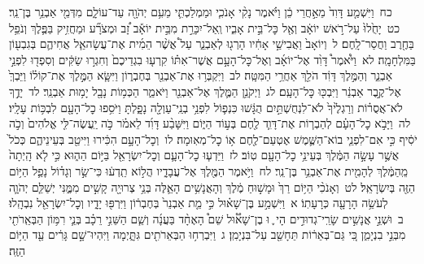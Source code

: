 \documentclass[18pt]{article}
\begin{document}
 {\loc כח~}וַיִּשְׁמַ֤ע דָּוִד֙ מֵאַ֣חֲרֵי כֵ֔ן וַיֹּ֗אמֶר נָקִ֨י אָנֹכִ֧י וּמַמְלַכְתִּ֛י מֵעִ֥ם יְהֹוָ֖ה עַד־עוֹלָ֑ם מִדְּמֵ֖י אַבְנֵ֥ר בֶּן־נֵֽר׃ \startlock
 {\loc כט~}יָחֻ֙לוּ֙ עַל־רֹ֣אשׁ יוֹאָ֔ב וְאֶ֖ל כׇּל־בֵּ֣ית אָבִ֑יו וְֽאַל־יִכָּרֵ֣ת מִבֵּ֣ית יוֹאָ֡ב זָ֠ב וּמְצֹרָ֞ע וּמַחֲזִ֥יק בַּפֶּ֛לֶךְ וְנֹפֵ֥ל בַּחֶ֖רֶב וַחֲסַר־לָֽחֶם׃ \startlock
 {\loc ל~}וְיוֹאָב֙ וַאֲבִישַׁ֣י אָחִ֔יו הָרְג֖וּ לְאַבְנֵ֑ר עַל֩ אֲשֶׁ֨ר הֵמִ֜ית אֶת־עֲשָׂהאֵ֧ל אֲחִיהֶ֛ם בְּגִבְע֖וֹן בַּמִּלְחָמָֽה׃ \startlock
 {\loc לא~}וַיֹּ֩אמֶר֩ דָּוִ֨ד אֶל־יוֹאָ֜ב וְאֶל־כׇּל־הָעָ֣ם אֲשֶׁר־אִתּ֗וֹ קִרְע֤וּ בִגְדֵיכֶם֙ וְחִגְר֣וּ שַׂקִּ֔ים וְסִפְד֖וּ לִפְנֵ֣י אַבְנֵ֑ר וְהַמֶּ֣לֶךְ דָּוִ֔ד הֹלֵ֖ךְ אַחֲרֵ֥י הַמִּטָּֽה׃ \startlock
 {\loc לב~}וַיִּקְבְּר֥וּ אֶת־אַבְנֵ֖ר בְּחֶבְר֑וֹן וַיִּשָּׂ֧א הַמֶּ֣לֶךְ אֶת־קוֹל֗וֹ וַיֵּבְךְּ֙ אֶל־קֶ֣בֶר אַבְנֵ֔ר וַיִּבְכּ֖וּ כׇּל־הָעָֽם׃ \startlock
 {\loc לג~}וַיְקֹנֵ֥ן הַמֶּ֛לֶךְ אֶל־אַבְנֵ֖ר וַיֹּאמַ֑ר הַכְּמ֥וֹת נָבָ֖ל יָמ֥וּת אַבְנֵֽר׃ \startlock
 {\loc לד~}יָדֶ֣ךָ לֹא־אֲסֻר֗וֹת וְרַגְלֶ֙יךָ֙ לֹא־לִנְחֻשְׁתַּ֣יִם הֻגָּ֔שׁוּ כִּנְפ֛וֹל לִפְנֵ֥י בְנֵֽי־עַוְלָ֖ה נָפָ֑לְתָּ וַיֹּסִ֥פוּ כׇל־הָעָ֖ם לִבְכּ֥וֹת עָלָֽיו׃ \startlock
 {\loc לה~}וַיָּבֹ֣א כׇל־הָעָ֗ם לְהַבְר֧וֹת אֶת־דָּוִ֛ד לֶ֖חֶם בְּע֣וֹד הַיּ֑וֹם וַיִּשָּׁבַ֨ע דָּוִ֜ד לֵאמֹ֗ר כֹּ֣ה יַֽעֲשֶׂה־לִּ֤י אֱלֹהִים֙ וְכֹ֣ה יֹסִ֔יף כִּ֣י אִם־לִפְנֵ֧י בוֹא־הַשֶּׁ֛מֶשׁ אֶטְעַם־לֶ֖חֶם א֥וֹ כׇל־מְאֽוּמָה׃ \startlock
 {\loc לו~}וְכׇל־הָעָ֣ם הִכִּ֔ירוּ וַיִּיטַ֖ב בְּעֵינֵיהֶ֑ם כְּכֹל֙ אֲשֶׁ֣ר עָשָׂ֣ה הַמֶּ֔לֶךְ בְּעֵינֵ֥י כׇל־הָעָ֖ם טֽוֹב׃ \startlock
 {\loc לז~}וַיֵּדְע֧וּ כׇל־הָעָ֛ם וְכׇל־יִשְׂרָאֵ֖ל בַּיּ֣וֹם הַה֑וּא כִּ֣י לֹ֤א הָֽיְתָה֙ מֵֽהַמֶּ֔לֶךְ לְהָמִ֖ית אֶת־אַבְנֵ֥ר בֶּן־נֵֽר׃ \startlock
 {\loc לח~}וַיֹּ֥אמֶר הַמֶּ֖לֶךְ אֶל־עֲבָדָ֑יו הֲל֣וֹא תֵֽדְע֔וּ כִּי־שַׂ֣ר וְגָד֗וֹל נָפַ֛ל הַיּ֥וֹם הַזֶּ֖ה בְּיִשְׂרָאֵֽל׃ \startlock
 {\loc לט~}וְאָנֹכִ֨י הַיּ֥וֹם רַךְ֙ וּמָשׁ֣וּחַ מֶ֔לֶךְ וְהָאֲנָשִׁ֥ים הָאֵ֛לֶּה בְּנֵ֥י צְרוּיָ֖ה קָשִׁ֣ים מִמֶּ֑נִּי יְשַׁלֵּ֧ם יְהֹוָ֛ה לְעֹשֵׂ֥ה הָרָעָ֖ה כְּרָעָתֽוֹ׃ 
\startlock
 {\loc א~}וַיִּשְׁמַ֣ע בֶּן־שָׁא֗וּל כִּ֣י מֵ֤ת אַבְנֵר֙ בְּחֶבְר֔וֹן וַיִּרְפּ֖וּ יָדָ֑יו וְכׇל־יִשְׂרָאֵ֖ל נִבְהָֽלוּ׃ \startlock
 {\loc ב~}וּשְׁנֵ֣י אֲנָשִׁ֣ים שָׂרֵֽי־גְדוּדִ֣ים הָי ֪ וּ בֶן־שָׁא֟וּל שֵׁם֩ הָאֶחָ֨ד בַּעֲנָ֜ה וְשֵׁ֧ם הַשֵּׁנִ֣י רֵכָ֗ב בְּנֵ֛י רִמּ֥וֹן הַבְּאֵֽרֹתִ֖י מִבְּנֵ֣י בִנְיָמִ֑ן כִּ֚י גַּם־בְּאֵר֔וֹת תֵּחָשֵׁ֖ב עַל־בִּנְיָמִֽן׃ \startlock
 {\loc ג~}וַיִּבְרְח֥וּ הַבְּאֵרֹתִ֖ים גִּתָּ֑יְמָה וַיִּהְיוּ־שָׁ֣ם גָּרִ֔ים עַ֖ד הַיּ֥וֹם הַזֶּֽה׃ \startlock
\end{document}
